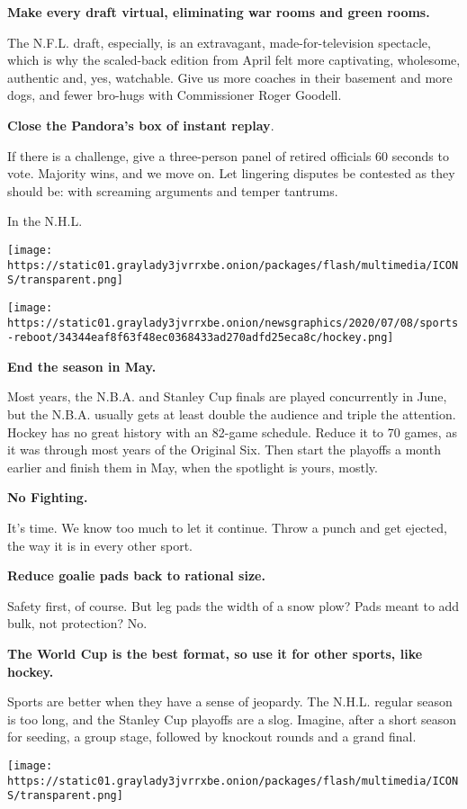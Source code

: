 \textbf{Make every draft virtual, eliminating war rooms and green
rooms.}

The N.F.L. draft, especially, is an extravagant, made-for-television
spectacle, which is why the scaled-back edition from April felt more
captivating, wholesome, authentic and, yes, watchable. Give us more
coaches in their basement and more dogs, and fewer bro-hugs with
Commissioner Roger Goodell.

\textbf{Close the Pandora's box of instant replay}.

If there is a challenge, give a three-person panel of retired officials
60 seconds to vote. Majority wins, and we move on. Let lingering
disputes be contested as they should be: with screaming arguments and
temper tantrums.

In the N.H.L.

\texttt{[image: https://static01.graylady3jvrrxbe.onion/packages/flash/multimedia/ICONS/transparent.png]}

\texttt{[image: https://static01.graylady3jvrrxbe.onion/newsgraphics/2020/07/08/sports-reboot/34344eaf8f63f48ec0368433ad270adfd25eca8c/hockey.png]}

\textbf{End the season in May.}

Most years, the N.B.A. and Stanley Cup finals are played concurrently in
June, but the N.B.A. usually gets at least double the audience and
triple the attention. Hockey has no great history with an 82-game
schedule. Reduce it to 70 games, as it was through most years of the
Original Six. Then start the playoffs a month earlier and finish them in
May, when the spotlight is yours, mostly.

\textbf{No Fighting.}

It's time. We know too much to let it continue. Throw a punch and get
ejected, the way it is in every other sport.

\textbf{Reduce goalie pads back to rational size.}

Safety first, of course. But leg pads the width of a snow plow? Pads
meant to add bulk, not protection? No.

\textbf{The World Cup is the best format, so use it for other sports,
like hockey.}

Sports are better when they have a sense of jeopardy. The N.H.L. regular
season is too long, and the Stanley Cup playoffs are a slog. Imagine,
after a short season for seeding, a group stage, followed by knockout
rounds and a grand final.

\texttt{[image: https://static01.graylady3jvrrxbe.onion/packages/flash/multimedia/ICONS/transparent.png]}

